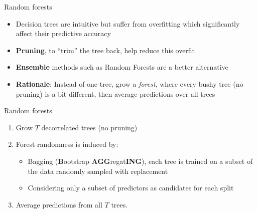 \documentclass[pdf]{beamer}
\begin{document}
\begin{frame}{Random forests}
\begin{itemize}\addtolength{\itemsep}{0.1\baselineskip}
	\item<2-> Decision trees are intuitive but suffer from overfitting which significantly affect their predictive accuracy
	\item<3-> \textbf{Pruning}, to ``trim'' the tree back, help reduce this overfit
	\item<4-> \textbf{Ensemble} methods such as Random Forests are a better alternative
	\item<5-> \textbf{Rationale}: Instead of one tree, grow a \textit{forest}, where every bushy tree (no pruning) is a bit different,
	then average predictions over all trees
\end{itemize}
\vfill
{}
\end{frame}

\begin{frame}{Random forests}
\begin{enumerate}\addtolength{\itemsep}{2\baselineskip}
	\item<2-> Grow $T$ decorrelated trees (no pruning)
	\item<3-> Forest randomness is induced by:
		\begin{itemize}
			\item<3-> Bagging (\textbf{B}ootstrap \textbf{AGG}regat\textbf{ING}), each tree is trained
			on a subset of the data randomly sampled with replacement
			\item<3-> Considering only a subset of predictors as candidates for each split
		\end{itemize}
	\item<4-> Average predictions from all $T$ trees.
\end{enumerate}
\end{frame}
\end{document}
